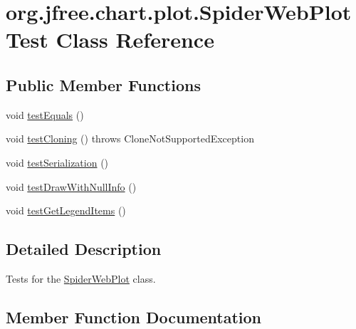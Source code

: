 \hypertarget{classorg_1_1jfree_1_1chart_1_1plot_1_1_spider_web_plot_test}{}\section{org.\+jfree.\+chart.\+plot.\+Spider\+Web\+Plot\+Test Class Reference}
\label{classorg_1_1jfree_1_1chart_1_1plot_1_1_spider_web_plot_test}
\subsection*{Public Member Functions}
\begin{DoxyCompactItemize}
\item 
void \mbox{\hyperlink{classorg_1_1jfree_1_1chart_1_1plot_1_1_spider_web_plot_test_a81229f2af40c90ca95790fc3f889eab8}{test\+Equals}} ()
\item 
void \mbox{\hyperlink{classorg_1_1jfree_1_1chart_1_1plot_1_1_spider_web_plot_test_afaefea821c09e619298ed51a1afdabd2}{test\+Cloning}} ()  throws Clone\+Not\+Supported\+Exception 
\item 
void \mbox{\hyperlink{classorg_1_1jfree_1_1chart_1_1plot_1_1_spider_web_plot_test_ad89075b83b3285ad4e2eace909417cac}{test\+Serialization}} ()
\item 
void \mbox{\hyperlink{classorg_1_1jfree_1_1chart_1_1plot_1_1_spider_web_plot_test_a38e1efdddfef29a8b7a57d857d31e187}{test\+Draw\+With\+Null\+Info}} ()
\item 
void \mbox{\hyperlink{classorg_1_1jfree_1_1chart_1_1plot_1_1_spider_web_plot_test_a0d35e44d7cca5533104dd2b098b9669b}{test\+Get\+Legend\+Items}} ()
\end{DoxyCompactItemize}


\subsection{Detailed Description}
Tests for the \mbox{\hyperlink{classorg_1_1jfree_1_1chart_1_1plot_1_1_spider_web_plot}{Spider\+Web\+Plot}} class. 

\subsection{Member Function Documentation}
\mbox{\label{classorg_1_1jfree_1_1chart_1_1plot_1_1_spider_web_plot_test_afaefea821c09e619298ed51a1afdabd2}} 
